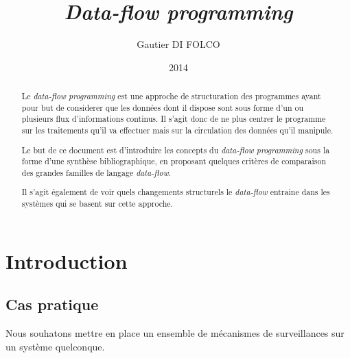 \documentclass{article}
\title{\emph{Data-flow programming}}
\author{Gautier DI FOLCO}
\date{2014}
\begin{document}
\maketitle
\tableofcontents

\begin{abstract}
Le \emph{data-flow programming} est une approche de structuration des programmes
ayant pour but de considerer que les données dont il dispose sont sous forme
d'un ou plusieurs flux d'informations continus.
Il s'agit donc de ne plus centrer le programme sur les traitements qu'il va
effectuer mais sur la circulation des données qu'il manipule.

Le but de ce document est d'introduire les concepts du \emph{data-flow programming}
sous la forme d'une synthèse bibliographique, en proposant quelques critères de
comparaison des grandes familles de langage \emph{data-flow}.

Il s'agit également de voir quels changements structurels le \emph{data-flow}
entraine dans les systèmes qui se basent sur cette approche.
\end{abstract}





\section{Introduction}\label{introduction}

\subsection{Cas pratique}
Nous souhatons mettre en place un ensemble de mécanismes de surveillances sur un
système quelconque.
\end{document}
